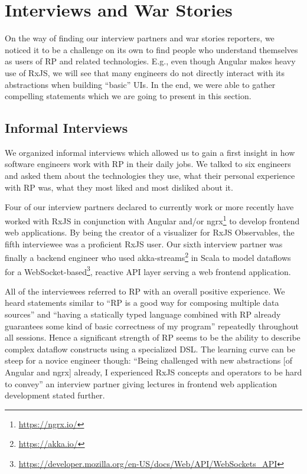 \documentclass[12pt,a4paper]{article}
\begin{document}
\section{Interviews and War Stories}
\label{sec:interviews}

On the way of finding our interview partners and war stories reporters, we noticed it to be a challenge on its own to find people who understand themselves as users of RP and related technologies. E.g., even though Angular makes heavy use of RxJS, we will see that many engineers do not directly interact with its abstractions when building ``basic'' UIs. In the end, we were able to gather compelling statements which we are going to present in this section.

\subsection{Informal Interviews}

We organized informal interviews which allowed us to gain a first insight in how software engineers work with RP in their daily jobs. We talked to six engineers and asked them about the technologies they use, what their personal experience with RP was, what they most liked and most disliked about it.

Four of our interview partners declared to currently work or more recently have worked with RxJS in conjunction with Angular and/or ngrx\footnote{\url{https://ngrx.io/}} to develop frontend web applications. By being the creator of a visualizer for RxJS Observables, the fifth interviewee was a proficient RxJS user. Our sixth interview partner was finally a backend engineer who used akka-streams\footnote{\url{https://akka.io/}} in Scala to model dataflows for a WebSocket-based\footnote{\url{https://developer.mozilla.org/en-US/docs/Web/API/WebSockets_API}}, reactive API layer serving a web frontend application.

All of the interviewees referred to RP with an overall positive experience. We heard statements similar to ``RP is a good way for composing multiple data sources'' and ``having a statically typed language combined with RP already guarantees some kind of basic correctness of my program'' repeatedly throughout all sessions. Hence a significant strength of RP seems to be the ability to describe complex dataflow constructs using a specialized DSL. The learning curve can be steep for a novice engineer though: ``Being challenged with new abstractions [of Angular and ngrx] already, I experienced RxJS concepts and operators to be hard to convey'' an interview partner giving lectures in frontend web application development stated further.
\end{document}

